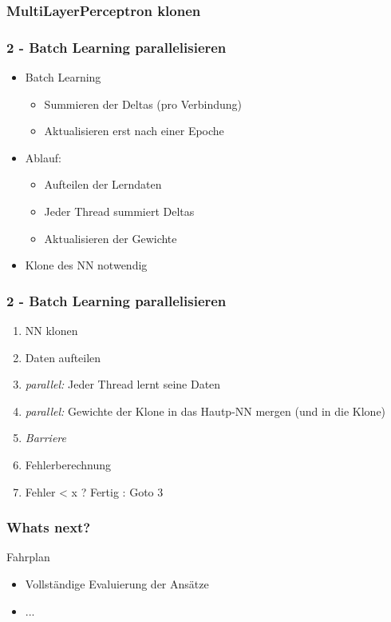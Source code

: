 \documentclass[18pt]{beamer}
\begin{document}
	\begin{frame}[c]\frametitle{MultiLayerPerceptron klonen}
	\end {frame}

	\begin{frame}[c]\frametitle{2 - Batch Learning parallelisieren}

		\begin{itemize}
			\item Batch Learning
			\begin{itemize}
				\item Summieren der Deltas (pro Verbindung)
				\item Aktualisieren erst nach einer Epoche
			\end{itemize}
			\item Ablauf:
			\begin{itemize}
				\item Aufteilen der Lerndaten
				\item Jeder Thread summiert Deltas
				\item Aktualisieren der Gewichte
			\end{itemize}
			\item Klone des NN notwendig
		\end{itemize}
	\end{frame}
	
	\begin{frame}[t]\frametitle{2 - Batch Learning parallelisieren}
		\begin{enumerate}
			\item NN klonen
			\item Daten aufteilen
			\item \textit{parallel:} Jeder Thread lernt seine Daten
			\item \textit{parallel:} Gewichte der Klone in das Hautp-NN mergen (und in die Klone)
			\item \textit{Barriere}
			\item Fehlerberechnung
			\item Fehler < x ? Fertig : Goto 3
		\end{enumerate}
	\end{frame}




	\begin{frame}[c]\frametitle{Whats next?}
		\begin{block}{Fahrplan}
		    \begin{itemize}
		    	\item Vollständige Evaluierung der Ansätze
		    	\item ...
		    \end{itemize}
		\end{block}
	\end{frame}
\end{document}
